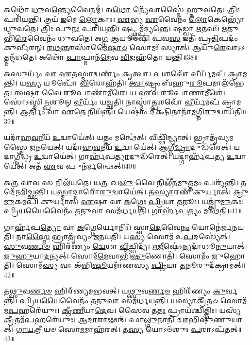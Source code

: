 𑌅𑌥𑍋᳴ \ul{𑌧𑍁}\-𑌵\-\ul{𑌨𑍍𑌤𑍍𑌯𑍇}\-𑌵𑍈𑌨𑌮𑍍॑।
𑌅\-\ul{𑌥𑍋} 𑌨𑍍𑌯𑍇᳴𑌵𑌾𑌸𑍍𑌮𑍈॑ 𑌹𑍍𑌨𑍁𑌵𑌤𑍇।
𑌤𑍍𑌰𑌿𑌃 𑌪𑌰𑌿᳴𑌯𑌨𑍍𑌤𑌿।
𑌤𑍍𑌰𑌯᳴ \ul{𑌇}\-𑌮𑍇 \ul{𑌲𑍋}\-𑌕𑌾𑌃।
\-\ul{𑌏}\-𑌭𑍍𑌯 \ul{𑌏}\-𑌵𑍈𑌨𑌂᳴ \ul{𑌲𑍋}\-𑌕𑍇𑌭𑍍𑌯𑍋᳴ 𑌧𑍁𑌵𑌤𑍇।
𑌤𑍍𑌰𑌿𑌃 𑌪𑍁\-\ul{𑌨𑌃} 𑌪𑌰𑌿᳴𑌯𑌨𑍍𑌤𑌿।
𑌷𑌟𑍍𑌥𑍍𑌸𑌮𑍍𑌪᳴𑌦𑍍𑌯𑌨𑍍𑌤𑍇।
𑌷𑌡𑍍𑌵𑌾 \ul{𑌋}\-𑌤𑌵𑌃᳴।
\-\ul{𑌋}\-𑌤𑍁𑌭𑌿᳴\-\ul{𑌰𑍇}\-𑌵𑍈𑌨𑌂᳴ 𑌧𑍁𑌵𑌤𑍇।
𑌅\-\ul{𑌗𑍍𑌨} 𑌆𑌯𑍂𑍞᳴𑌷𑌿 𑌪𑌵\-\ul{𑌸} 𑌇𑌤𑌿᳴ 𑌪𑍍𑌰\-\ul{𑌤𑌿}\-𑌪𑌦𑌂᳴ 𑌕𑍁𑌰𑍍𑌵𑍀𑌰𑌨𑍍।
\-\ul{𑌰}\-\-\ul{𑌥}\-\-\ul{𑌨𑍍𑌤}\-𑌰𑌸𑌾᳴𑌮𑍈\-\ul{𑌷𑌾}\-\-\ul{𑍞} 𑌸𑍋𑌮𑌃᳴ 𑌸𑍍𑌯𑌾𑌤𑍍।
𑌆𑌯𑍁᳴\-\ul{𑌰𑍇}\-𑌵𑌾𑌽𑌽𑌤𑍍𑌮𑌨𑍍𑌦᳴𑌧𑌤𑍇।
𑌅𑌥𑍋᳴ \ul{𑌪𑌾}\-𑌪𑍍𑌮𑌾𑌨᳴\-\ul{𑌮𑍇}\-𑌵 \ul{𑌵𑌿}\-𑌜𑌹᳴𑌤𑍋 𑌯𑌨𑍍𑌤𑌿॥38॥\anuvakamend[\-\ul{𑌅}\-𑌭𑌿𑌜𑌿᳴𑌤𑍍𑌯𑍈 𑌪𑍃\-\ul{𑌥𑌿}\-𑌵𑍍𑌯𑌾\-\ul{𑌶𑍍𑌚} 𑌸𑍍𑌯𑌾𑌦᳴\-\ul{𑌧𑍍𑌵}\-𑌰𑍍𑌯𑍁𑌰𑍍𑌬𑍍𑌰𑍂᳴𑌯𑌾\-\ul{𑌲𑍍𑌲𑍋}\-𑌕\-\ul{𑌯𑍋𑌃} 𑌪𑌰𑌿᳴𑌦𑌦𑌤𑌿 𑌕𑍁𑌰𑍍𑌵𑍀\-\ul{𑌰}\-\-\ul{𑍟}\-𑌸𑍍𑌤𑍍𑌰𑍀𑌣𑌿᳴ 𑌚]

\-\ul{𑌅}\-\-\ul{𑌸𑍁}\-𑌰𑍍𑌯𑌂᳴ 𑌵𑌾 \ul{𑌏}\-𑌤\-\ul{𑌸𑍍𑌮𑌾}\-𑌦𑍍𑌵𑌰𑍍𑌣𑌂᳴ \ul{𑌕𑍃}\-𑌤𑍍𑌵𑌾।
\-\ul{𑌪}\-𑌶𑌵𑍋᳴ \ul{𑌵𑍀}\-𑌰𑍍𑌯᳴𑌮𑌪᳴ 𑌕𑍍𑌰𑌾𑌮𑌨𑍍𑌤𑌿।
𑌯\-\ul{𑌸𑍍𑌯} 𑌯𑍂𑌪𑍋᳴ \ul{𑌵𑌿}\-𑌰𑍋𑌹᳴𑌤𑌿।
\-\ul{𑌤𑍍𑌵𑌾}\-𑌷𑍍𑌟𑍍𑌰𑌂 𑌬᳴𑌹𑍁\-\ul{𑌰𑍂}\-𑌪𑌮𑌾𑌲᳴𑌭𑍇𑌤।
𑌤𑍍𑌵\-\ul{𑌷𑍍𑌟𑌾} 𑌵𑍈 \ul{𑌰𑍂}\-𑌪𑌾𑌣𑌾᳴𑌮𑍀𑌶𑍇।
𑌯 \ul{𑌏}\-𑌵 \ul{𑌰𑍂}\-𑌪𑌾\-\ul{𑌣𑌾}\-𑌮𑍀𑌶𑍇॑।
𑌸𑍋॑𑌽𑌸𑍍𑌮𑌿\-\ul{𑌨𑍍𑌪}\-𑌶𑍂𑌨𑍍 \ul{𑌵𑍀}\-𑌰𑍍𑌯𑌂᳴ 𑌯𑌚𑍍𑌛𑌤𑌿।
𑌨𑌾𑌸𑍍𑌮𑌾॑\-\ul{𑌤𑍍𑌪}\-𑌶𑌵𑍋᳴ \ul{𑌵𑍀}\-𑌰𑍍𑌯᳴𑌮𑌪᳴ 𑌕𑍍𑌰𑌾𑌮𑌨𑍍𑌤𑌿।
𑌆\-\ul{𑌰𑍍𑌤𑌿𑌂} 𑌵𑌾 \ul{𑌏}\-𑌤𑍇 𑌨𑌿𑌯᳴𑌨𑍍𑌤𑌿।
𑌯𑍇𑌷𑌾𑌂॑ 𑌦𑍀\-\ul{𑌕𑍍𑌷𑌿}\-𑌤𑌾𑌨𑌾᳴\-\ul{𑌮}\-𑌗𑍍𑌨𑌿\-\ul{𑌰𑍁}\-𑌦𑍍𑌵𑌾𑌯᳴𑌤𑌿॥39॥

𑌯𑌦𑌾᳴𑌹\-\ul{𑌵}\-𑌨𑍀𑌯᳴ \ul{𑌉}\-𑌦𑍍𑌵𑌾𑌯𑍇॑𑌤𑍍।
𑌯𑌤𑍍𑌤𑌂 𑌮𑌨𑍍𑌥𑍇॑𑌤𑍍।
𑌵𑌿𑌚𑍍𑌛𑌿᳴𑌨𑍍𑌦𑍍𑌯𑌾𑌤𑍍।
𑌭𑍍𑌰𑌾𑌤𑍃᳴𑌵𑍍𑌯𑌮𑌸𑍍𑌮𑍈 𑌜𑌨𑌯𑍇𑌤𑍍।
𑌯𑌦𑌾᳴𑌹\-\ul{𑌵}\-𑌨𑍀𑌯᳴ \ul{𑌉}\-𑌦𑍍𑌵𑌾𑌯𑍇॑𑌤𑍍।
𑌆𑌗𑍍𑌨𑍀॑\-\ul{𑌦𑍍𑌧𑍍𑌰𑌾}\-𑌦𑍁𑌦𑍍𑌧᳴\-𑌰𑍇𑌤𑍍।
𑌯𑌦𑌾𑌗𑍍𑌨𑍀॑𑌦𑍍𑌧𑍍𑌰 \ul{𑌉}\-𑌦𑍍𑌵𑌾𑌯𑍇॑𑌤𑍍।
𑌗𑌾𑌰𑍍\mbox{}𑌹᳴𑌪\-\ul{𑌤𑍍𑌯𑌾}\-𑌦𑍁𑌦𑍍𑌧᳴𑌰𑍇𑌤𑍍।
𑌯𑌦𑍍𑌗𑌾𑌰𑍍\mbox{}𑌹᳴𑌪𑌤𑍍𑌯 \ul{𑌉}\-𑌦𑍍𑌵𑌾𑌯𑍇॑𑌤𑍍।
𑌅𑌤᳴ \ul{𑌏}\-𑌵 𑌪𑍁𑌨᳴𑌰𑍍𑌮𑌨𑍍𑌥𑍇𑌤𑍍॥40॥

𑌅\-\ul{𑌤𑍍𑌰} 𑌵𑌾𑌵 𑌸 𑌨𑌿𑌲᳴𑌯𑌤𑍇।
𑌯\-\ul{𑌤𑍍𑌰} 𑌖\-\ul{𑌲𑍁} 𑌵𑍈 𑌨𑌿𑌲𑍀᳴𑌨𑌮𑍁\-\ul{𑌤𑍍𑌤}\-𑌮𑌂 𑌪𑌶𑍍𑌯᳴𑌨𑍍𑌤𑌿।
𑌤𑌦𑍇᳴𑌨𑌮𑌿𑌚𑍍𑌛𑌨𑍍𑌤𑌿।
𑌯\-\ul{𑌸𑍍𑌮𑌾}\-𑌦𑍍𑌦𑌾𑌰𑍋᳴\-\ul{𑌰𑍁}\-𑌦𑍍𑌵𑌾𑌯𑍇॑𑌤𑍍।
𑌤\-\ul{𑌸𑍍𑌯𑌾}\-𑌰𑌣𑍀᳴ 𑌕𑍁𑌰𑍍𑌯𑌾𑌤𑍍।
\-\ul{𑌕𑍍𑌰𑍁}\-\-\ul{𑌮𑍁}\-𑌕𑌮𑌪𑌿᳴ 𑌕𑍁𑌰𑍍𑌯𑌾𑌤𑍍।
\-\ul{𑌏}\-𑌷𑌾 𑌵𑌾 \ul{𑌅}\-𑌗𑍍𑌨𑍇𑌃 \ul{𑌪𑍍𑌰𑌿}\-𑌯𑌾 \ul{𑌤}\-𑌨𑍂𑌃।
𑌯𑌤𑍍𑌕𑍍𑌰𑍁᳴\-\ul{𑌮𑍁}\-𑌕𑌃।
\-\ul{𑌪𑍍𑌰𑌿}\-𑌯\-\ul{𑌯𑍈}\-𑌵𑍈𑌨𑌂᳴ \ul{𑌤}\-𑌨𑍁\-\ul{𑌵𑌾} 𑌸𑌮᳴𑌰𑍍𑌧𑌯𑌤𑌿।
𑌗𑌾𑌰𑍍\mbox{}𑌹᳴𑌪𑌤𑍍𑌯𑌂 𑌮𑌨𑍍𑌥𑌤𑌿॥41॥

𑌗𑌾𑌰𑍍\mbox{}𑌹᳴𑌪\-\ul{𑌤𑍍𑌯𑍋} 𑌵𑌾 \ul{𑌅}\-𑌗𑍍𑌨𑍇𑌰𑍍𑌯𑍋𑌨𑌿𑌃᳴।
𑌸𑍍𑌵𑌾\-\ul{𑌦𑍇}\-𑌵𑍈\-\ul{𑌨𑌂} 𑌯𑍋𑌨𑍇॑𑌰𑍍𑌜𑌨𑌯𑌤𑌿।
𑌨𑌾\-\ul{𑌸𑍍𑌮𑍈} 𑌭𑍍𑌰𑌾𑌤𑍃᳴𑌵𑍍𑌯𑌂 𑌜𑌨𑌯𑌤𑌿।
𑌯\-\ul{𑌸𑍍𑌯} 𑌸𑍋𑌮᳴ 𑌉\-\ul{𑌪}\-𑌦𑌸𑍍𑌯𑍇॑𑌤𑍍।
\-\ul{𑌸𑍁}\-𑌵\-\ul{𑌰𑍍𑌣}\-\-\ul{𑍞} 𑌹𑌿𑌰᳴𑌣𑍍𑌯𑌂 \ul{𑌦𑍍𑌵𑍇}\-𑌧𑌾 \ul{𑌵𑌿}\-𑌚𑍍𑌛𑌿𑌦𑍍𑌯᳴।
\-\ul{𑌋}\-\-\ul{𑌜𑍀}\-𑌷𑍇॑\-𑌽𑌨𑍍𑌯𑌦𑌾᳴𑌧𑍂\-\ul{𑌨𑍁}\-𑌯𑌾𑌤𑍍।
\-\ul{𑌜𑍁}\-\-\ul{𑌹𑍁}\-𑌯𑌾\-\ul{𑌦}\-𑌨𑍍𑌯𑌤𑍍।
𑌸𑍋𑌮᳴\-\ul{𑌮𑍇}\-𑌵𑌾𑌭𑌿᳴\-\ul{𑌷𑍁}\-𑌣𑍋𑌤𑌿᳴।
𑌸𑍋𑌮𑌂᳴ 𑌜𑍁𑌹𑍋𑌤𑌿।
𑌸𑍋𑌮᳴\-\ul{𑌸𑍍𑌯} 𑌵𑌾 𑌅᳴𑌭𑌿\-\ul{𑌷𑍂}\-𑌯𑌮𑌾᳴𑌣𑌸𑍍𑌯 \ul{𑌪𑍍𑌰𑌿}\-𑌯𑌾 \ul{𑌤}\-𑌨𑍂𑌰𑍁𑌦᳴𑌕𑍍𑌰𑌾𑌮𑌤𑍍॥42॥

𑌤\-\ul{𑌥𑍍𑌸𑍁}\-𑌵\-\ul{𑌰𑍍𑌣}\-\-\ul{𑍞} 𑌹𑌿𑌰᳴𑌣𑍍𑌯𑌮𑌭𑌵𑌤𑍍।
𑌯\-\ul{𑌥𑍍𑌸𑍁}\-𑌵\-\ul{𑌰𑍍𑌣}\-\-\ul{𑍞} 𑌹𑌿𑌰᳴𑌣𑍍𑌯𑌂 \ul{𑌕𑍁}\-𑌰𑍍𑌵𑌨𑍍𑌤𑌿᳴।
\-\ul{𑌪𑍍𑌰𑌿}\-𑌯\-\ul{𑌯𑍈}\-𑌵𑍈𑌨𑌂᳴ \ul{𑌤}\-𑌨𑍁\-\ul{𑌵𑌾} 𑌸𑌮᳴𑌰𑍍𑌧𑌯𑌨𑍍𑌤𑌿।
𑌯𑌸𑍍𑌯𑌾𑌕𑍍𑌰𑍀᳴\-\ul{𑌤}\-\-\ul{𑍞} 𑌸𑍋𑌮᳴𑌮\-\ul{𑌪}\-𑌹𑌰𑍇᳴𑌯𑍁𑌃।
\-\ul{𑌕𑍍𑌰𑍀}\-\-\ul{𑌣𑍀}\-𑌯𑌾\-\ul{𑌦𑍇}\-𑌵।
𑌸𑍈𑌵 𑌤\-\ul{𑌤𑌃} 𑌪𑍍𑌰𑌾𑌯᳴𑌶𑍍𑌚𑌿𑌤𑍍𑌤𑌿𑌃।
𑌯𑌸𑍍𑌯᳴ \ul{𑌕𑍍𑌰𑍀}\-𑌤𑌮᳴\-\ul{𑌪}\-𑌹𑌰𑍇᳴𑌯𑍁𑌃।
\-\ul{𑌆}\-\-\ul{𑌦𑌾}\-𑌰𑌾𑍟𑌶𑍍𑌚᳴ 𑌫𑌾\-\ul{𑌲𑍍𑌗𑍁}\-𑌨𑌾𑌨𑌿᳴ \ul{𑌚𑌾}\-𑌭𑌿𑌷𑍁᳴𑌣𑍁𑌯𑌾𑌤𑍍।
\-\ul{𑌗𑌾}\-\-\ul{𑌯}\-𑌤𑍍𑌰𑍀 𑌯𑍞 𑌸𑍋\-\ul{𑌮}\-𑌮𑌾𑌹᳴𑌰𑌤𑍍।
𑌤\-\ul{𑌸𑍍𑌯} 𑌯𑍋𑌽𑍞᳴𑌶𑍁𑌃 \ul{𑌪}\-𑌰𑌾\-𑌽𑌪᳴𑌤𑌤𑍍॥43॥

